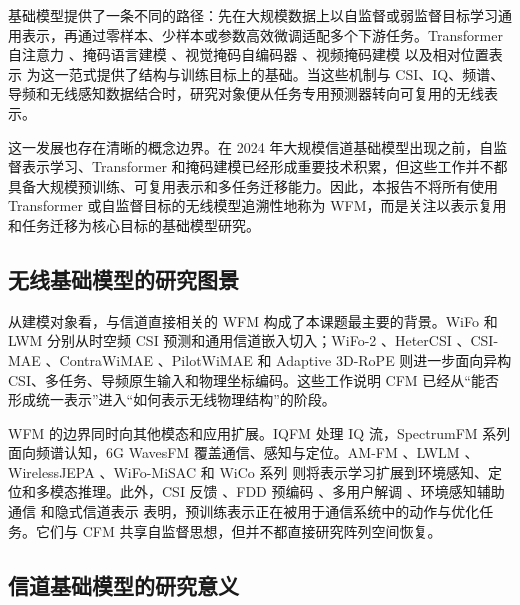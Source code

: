 \documentclass[journal]{IEEEtran}
\begin{document}
基础模型提供了一条不同的路径：先在大规模数据上以自监督或弱监督目标学习通用表示，再通过零样本、少样本或参数高效微调适配多个下游任务。Transformer 自注意力 \cite{vaswani2017attention}、掩码语言建模 \cite{devlin2019bert}、视觉掩码自编码器 \cite{he2022mae}、视频掩码建模 \cite{tong2022videomae} 以及相对位置表示 \cite{shaw2018relative} 为这一范式提供了结构与训练目标上的基础。当这些机制与 CSI、IQ、频谱、导频和无线感知数据结合时，研究对象便从任务专用预测器转向可复用的无线表示。

这一发展也存在清晰的概念边界。在 2024 年大规模信道基础模型出现之前，自监督表示学习、Transformer 和掩码建模已经形成重要技术积累，但这些工作并不都具备大规模预训练、可复用表示和多任务迁移能力。因此，本报告不将所有使用 Transformer 或自监督目标的无线模型追溯性地称为 WFM，而是关注以表示复用和任务迁移为核心目标的基础模型研究。

\subsection{无线基础模型的研究图景}

从建模对象看，与信道直接相关的 WFM 构成了本课题最主要的背景。WiFo \cite{liu2025wifo} 和 LWM \cite{alikhani2024lwm} 分别从时空频 CSI 预测和通用信道嵌入切入；WiFo-2 \cite{liu2026wifo2}、HeterCSI \cite{jiang2026hetercsi}、CSI-MAE \cite{jiang2026csimae}、ContraWiMAE \cite{guler2026contrawimae}、PilotWiMAE \cite{guler2026pilotwimae} 和 Adaptive 3D-RoPE \cite{zhang2026adaptive3drope} 则进一步面向异构 CSI、多任务、导频原生输入和物理坐标编码。这些工作说明 CFM 已经从“能否形成统一表示”进入“如何表示无线物理结构”的阶段。

WFM 的边界同时向其他模态和应用扩展。IQFM \cite{zhou2026iqfm} 处理 IQ 流，SpectrumFM 系列 \cite{zhou2025spectrumfm,liu2025spectrumfm} 面向频谱认知，6G WavesFM \cite{aboulfotouh2025wavesfm} 覆盖通信、感知与定位。AM-FM \cite{zhu2026amfm}、LWLM \cite{pan2026lwlm}、WirelessJEPA \cite{mashaal2026wirelessjepa}、WiFo-MiSAC \cite{liu2026wifomisac} 和 WiCo 系列 \cite{han2026wicomeg,sun2026wicopg} 则将表示学习扩展到环境感知、定位和多模态推理。此外，CSI 反馈 \cite{liu2026wifocf}、FDD 预编码 \cite{wen2026wifoe}、多用户解调 \cite{yang2026wifomud}、环境感知辅助通信 \cite{zhang2026wifom2} 和隐式信道表示 \cite{liu2026wifoinr} 表明，预训练表示正在被用于通信系统中的动作与优化任务。它们与 CFM 共享自监督思想，但并不都直接研究阵列空间恢复。

\subsection{信道基础模型的研究意义}
\end{document}
